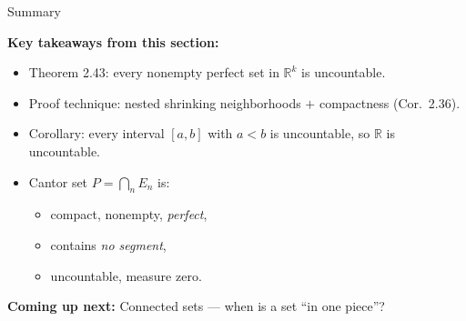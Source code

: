 \documentclass[aspectratio=169,12pt,t]{beamer}
\begin{document}
{%
\begin{frame}{Summary}
  \begin{hlbox}
    \textbf{Key takeaways from this section:}
    \begin{itemize}
      \item \alert{Theorem 2.43}: every nonempty perfect set in $\mathbb{R}^k$ is uncountable.
      \item Proof technique: nested shrinking neighborhoods $+$ compactness (Cor.\ 2.36).
      \item \alert{Corollary}: every interval $[a,b]$ with $a<b$ is uncountable, so $\mathbb{R}$ is uncountable.
      \item \alert{Cantor set} $P = \bigcap_n E_n$ is:
        \begin{itemize}
          \item compact, nonempty, \emph{perfect},
          \item contains \emph{no segment},
          \item uncountable, measure zero.
        \end{itemize}
    \end{itemize}

    \vspace{0.4em}
    \textbf{Coming up next:} Connected sets --- when is a set ``in one piece''?
  \end{hlbox}

\end{frame}
}
\end{document}
